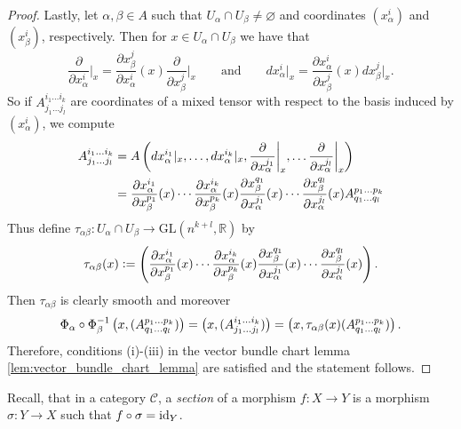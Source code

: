 \begin{proof}
	Lastly, let $\alpha, \beta \in A$ such that $U_\alpha \cap U_\beta \neq \varnothing$ and coordinates $(x^i_\alpha)$ and $(x^i_\beta)$, respectively. Then for $x \in U_\alpha \cap U_\beta$ we have that
	\begin{equation*}
		\frac{\partial}{\partial x_\alpha^i}\bigg\vert_x = \frac{\partial x^j_\beta}{\partial x_\alpha^i}(x)\frac{\partial}{\partial x_\beta^j}\bigg\vert_x \qquad \text{and} \qquad dx_\alpha^i\vert_x = \frac{\partial x_\alpha^i}{\partial x_\beta^j}(x)dx^j_\beta\vert_x.
	\end{equation*}
	So if $A^{i_1\dots i_k}_{j_1\dots j_l}$ are coordinates of a mixed tensor with respect to the basis induced by $(x^i_\alpha)$, we compute
	\begin{align*}
		A^{i_1\dots i_k}_{j_1\dots j_l} &= A\del[3]{dx_\alpha^{i_1}\vert_x,\dots,dx_\alpha^{i_k}\vert_x,\frac{\partial}{\partial x_\alpha^{j_1}}\bigg\vert_x,\dots\frac{\partial}{\partial x_\alpha^{j_l}}\bigg\vert_x}\\
		&= \frac{\partial x_\alpha^{i_1}}{\partial x^{p_1}_\beta}(x)\cdots\frac{\partial x_\alpha^{i_k}}{\partial x_\beta^{p_k}}(x)\frac{\partial x^{q_1}_\beta}{\partial x_\alpha^{j_1}}(x) \cdots \frac{\partial x^{q_l}_\beta}{\partial x_\alpha^{j_l}}(x)A^{p_1\dots p_k}_{q_1\dots q_l}
	\end{align*}
	Thus define $\tau_{\alpha\beta}: U_\alpha \cap U_\beta \to \mathrm{GL}(n^{k + l},\mathbb{R})$ by
	\begin{equation*}
		\tau_{\alpha\beta}(x) := \del[4]{\frac{\partial x_\alpha^{i_1}}{\partial x^{p_1}_\beta}(x)\cdots\frac{\partial x_\alpha^{i_k}}{\partial x_\beta^{p_k}}(x)\frac{\partial x^{q_1}_\beta}{\partial x_\alpha^{j_1}}(x) \cdots \frac{\partial x^{q_l}_\beta}{\partial x_\alpha^{j_l}}(x)}.
	\end{equation*}
	Then $\tau_{\alpha\beta}$ is clearly smooth and moreover
	\begin{equation*}
		\Phi_\alpha \circ \Phi_\beta^{-1}\del[1]{x,(A^{p_1\dots p_k}_{q_1\dots q_l})} = \del[1]{x, (A^{i_1\dots i_k}_{j_1\dots j_l})} = \del[1]{x,\tau_{\alpha\beta}(x)(A^{p_1\dots p_k}_{q_1\dots q_l})}. 
	\end{equation*}
	Therefore, conditions (i)-(iii) in the vector bundle chart lemma \ref{lem:vector_bundle_chart_lemma} are satisfied and the statement follows.
\end{proof}

Recall, that in a category $\mathcal{C}$, a \emph{section} of a morphism $f : X \to Y$ is a morphism $\sigma : Y \to X$ such that $f \circ \sigma = \operatorname{id}_Y$.

